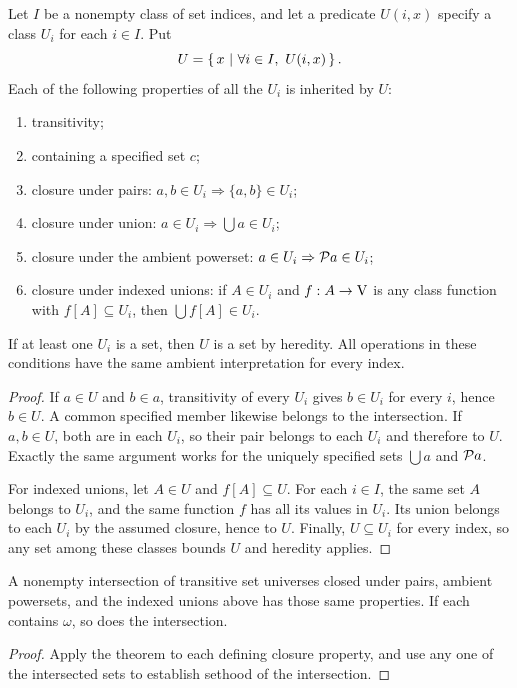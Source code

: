 \begin{theorem}
Let $I$ be a nonempty class of set indices, and let a predicate $U(i,x)$
specify a class $U_i$ for each $i\in I$. Put
\[
U=\cc{x}{\forall i\in I,\ U(i,x)}.
\]
Each of the following properties of all the $U_i$ is inherited by $U$:
\begin{enumerate}
\item transitivity;
\item containing a specified set $c$;
\item closure under pairs: $a,b\in U_i\Rightarrow\{a,b\}\in U_i$;
\item closure under union: $a\in U_i\Rightarrow\bigcup a\in U_i$;
\item closure under the ambient powerset:
      $a\in U_i\Rightarrow\mathcal{P} a\in U_i$;
\item closure under indexed unions: if $A\in U_i$ and
      $f:A\to\mathrm{V}$ is any class function with $f[A]\subseteq U_i$, then
      $\bigcup f[A]\in U_i$.
\end{enumerate}
If at least one $U_i$ is a set, then $U$ is a set by heredity.
All operations in these conditions have the same ambient interpretation
for every index.
\end{theorem}
\begin{proof}
If $a\in U$ and $b\in a$, transitivity of every $U_i$ gives
$b\in U_i$ for every $i$, hence $b\in U$. A common specified member
likewise belongs to the intersection. If $a,b\in U$, both are in each
$U_i$, so their pair belongs to each $U_i$ and therefore to $U$.
Exactly the same argument works for the uniquely specified sets
$\bigcup a$ and $\mathcal{P} a$.

For indexed unions, let $A\in U$ and $f[A]\subseteq U$. For each
$i\in I$, the same set $A$ belongs to $U_i$, and the same function
$f$ has all its values in $U_i$. Its union belongs to each $U_i$ by
the assumed closure, hence to $U$. Finally, $U\subseteq U_i$ for every
index, so any set among these classes bounds $U$ and heredity applies.
\end{proof}

\begin{corollary}
A nonempty intersection of transitive set universes closed under pairs,
ambient powersets, and the indexed unions above has those same properties.
If each contains $\omega$, so does the intersection.
\end{corollary}
\begin{proof}
Apply the theorem to each defining closure property, and use any one of
the intersected sets to establish sethood of the intersection.
\end{proof}

